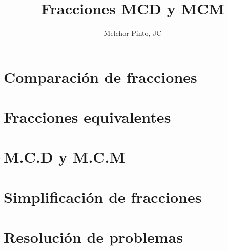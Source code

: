 \documentclass{guia}
\title{Fracciones MCD y MCM}
\author{Melchor Pinto, JC}
\begin{document}
%
\begin{questions}
\section{Comparación de fracciones}
\questionboxed{}
\section{Fracciones equivalentes}
\questionboxed{}
\section{M.C.D y M.C.M}
\questionboxed{}
\section{Simplificación de fracciones}
\questionboxed{}
\section{Resolución de problemas}
\questionboxed{}
\end{questions}
\end{document}
